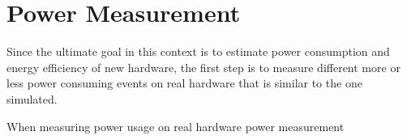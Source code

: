 \section{Power Measurement}
Since the ultimate goal in this context is to estimate power consumption and energy efficiency
of new hardware, the first step is to measure different more or less power consuming events on
real hardware that is similar to the one simulated.

When measuring power usage on real hardware power measurement 

